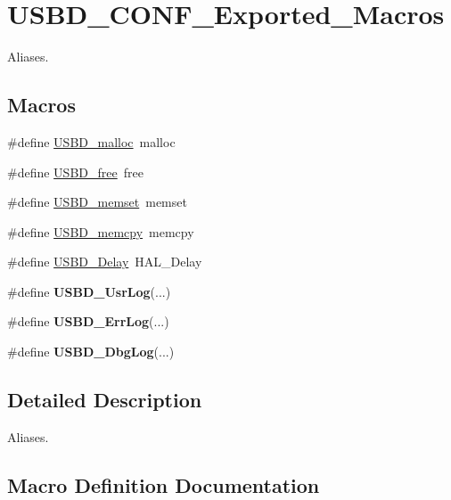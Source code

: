 \hypertarget{group___u_s_b_d___c_o_n_f___exported___macros}{}\section{U\+S\+B\+D\+\_\+\+C\+O\+N\+F\+\_\+\+Exported\+\_\+\+Macros}
\label{group___u_s_b_d___c_o_n_f___exported___macros}


Aliases.  


\subsection*{Macros}
\begin{DoxyCompactItemize}
\item 
\#define \hyperlink{group___u_s_b_d___c_o_n_f___exported___macros_ga35ff353194f56823357f503e546ccf4b}{U\+S\+B\+D\+\_\+malloc}~malloc
\item 
\#define \hyperlink{group___u_s_b_d___c_o_n_f___exported___macros_gab44fcf9b4d7bfbe8b1308eca76975fe5}{U\+S\+B\+D\+\_\+free}~free
\item 
\#define \hyperlink{group___u_s_b_d___c_o_n_f___exported___macros_gaf7b31857d15ef0abbd84e0e70a2b903f}{U\+S\+B\+D\+\_\+memset}~memset
\item 
\#define \hyperlink{group___u_s_b_d___c_o_n_f___exported___macros_ga18d9c17ef2afe7244b559ed428ca1e81}{U\+S\+B\+D\+\_\+memcpy}~memcpy
\item 
\#define \hyperlink{group___u_s_b_d___c_o_n_f___exported___macros_ga78993b66136329032c26d0c13a78e963}{U\+S\+B\+D\+\_\+\+Delay}~H\+A\+L\+\_\+\+Delay
\item 
\#define {\bfseries U\+S\+B\+D\+\_\+\+Usr\+Log}(...)
\item 
\#define {\bfseries U\+S\+B\+D\+\_\+\+Err\+Log}(...)
\item 
\#define {\bfseries U\+S\+B\+D\+\_\+\+Dbg\+Log}(...)
\end{DoxyCompactItemize}


\subsection{Detailed Description}
Aliases. 



\subsection{Macro Definition Documentation}
\mbox{\label{group___u_s_b_d___c_o_n_f___exported___macros_ga009d0ba418c356a4668fac6115b07ac5}} 
